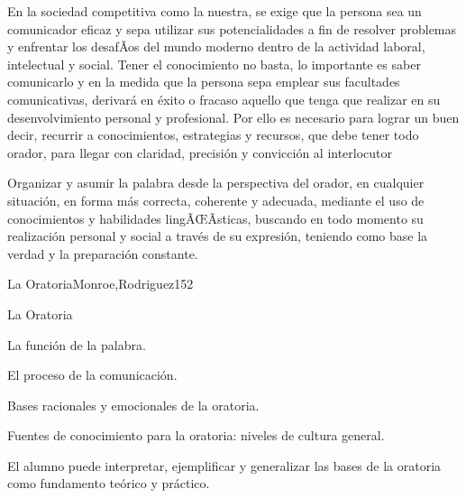 \begin{syllabus}


\begin{justification}
En la sociedad competitiva como la nuestra,  se exige que la persona sea un comunicador eficaz y  sepa utilizar sus potencialidades a fin de resolver problemas y enfrentar los desafÃ­os del mundo moderno dentro de la actividad laboral, intelectual y social. Tener el conocimiento no basta, lo importante es saber comunicarlo y en la medida que la persona sepa emplear sus facultades comunicativas, derivará en éxito o fracaso aquello que tenga que realizar en su desenvolvimiento personal y profesional. Por ello es necesario para lograr un buen decir, recurrir a conocimientos, estrategias y recursos, que debe tener todo orador, para llegar con claridad, precisión y convicción al interlocutor
\end{justification}

\begin{goals}
\item Organizar y asumir la palabra desde la perspectiva del orador, en cualquier situación, en forma más correcta, coherente  y adecuada, mediante el uso de conocimientos y habilidades lingÃŒÃ­sticas, buscando en todo momento su realización personal y social  a través de su expresión, teniendo como base  la verdad y la preparación constante.  
\end{goals}

\begin{outcomes}
\end{outcomes}

\begin{unit}{La Oratoria}{Monroe,Rodriguez}{15}{2}
\begin{topics}
	\item La Oratoria
	\item La función de la palabra.
	\item El proceso de la comunicación.
	\item Bases racionales y emocionales de la oratoria.
	\item Fuentes de conocimiento para la oratoria: niveles de cultura general.
\end{topics}
\begin{unitgoals}
	\item El alumno puede interpretar, ejemplificar y generalizar las bases de la oratoria como fundamento teórico  y  práctico.
\end{unitgoals}
\end{unit}


\end{syllabus}
